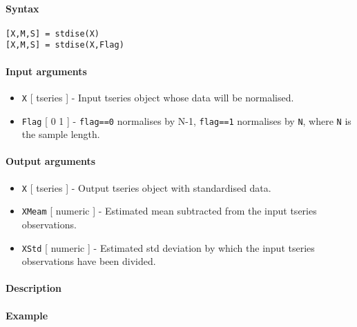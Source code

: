 


	\paragraph{Syntax}\label{syntax}

\begin{verbatim}
[X,M,S] = stdise(X)
[X,M,S] = stdise(X,Flag)
\end{verbatim}

\paragraph{Input arguments}\label{input-arguments}

\begin{itemize}
\item
  \texttt{X} {[} tseries {]} - Input tseries object whose data will be
  normalised.
\item
  \texttt{Flag} {[} 0 \textbar{} 1 {]} - \texttt{flag==0} normalises by
  N-1, \texttt{flag==1} normalises by \texttt{N}, where \texttt{N} is
  the sample length.
\end{itemize}

\paragraph{Output arguments}\label{output-arguments}

\begin{itemize}
\item
  \texttt{X} {[} tseries {]} - Output tseries object with standardised
  data.
\item
  \texttt{XMeam} {[} numeric {]} - Estimated mean subtracted from the
  input tseries observations.
\item
  \texttt{XStd} {[} numeric {]} - Estimated std deviation by which the
  input tseries observations have been divided.
\end{itemize}

\paragraph{Description}\label{description}

\paragraph{Example}\label{example}


